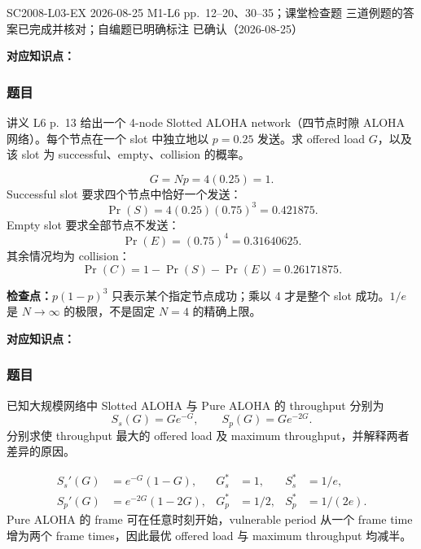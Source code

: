 

\examplemeta
  {SC2008-L03-EX}
  {2026-08-25}
  {M1-L6 pp.~12--20、30--35；课堂检查题}
  {三道例题的答案已完成并核对；自编题已明确标注}
  {已确认（2026-08-25）}


\textbf{对应知识点：}

\subsubsection*{题目}

讲义 L6 p.~13 给出一个 4-node Slotted ALOHA network（四节点时隙 ALOHA 网络）。每个节点在一个 slot 中独立地以 $p=0.25$ 发送。求 offered load $G$，以及该 slot 为 successful、empty、collision 的概率。

\begin{checkedsolution}
\[
  G=Np=4(0.25)=1.
\]
Successful slot 要求四个节点中恰好一个发送：
\[
  \Pr(S)=4(0.25)(0.75)^3=0.421875.
\]
Empty slot 要求全部节点不发送：
\[
  \Pr(E)=(0.75)^4=0.31640625.
\]
其余情况均为 collision：
\[
  \Pr(C)=1-\Pr(S)-\Pr(E)=0.26171875.
\]
\end{checkedsolution}

\textbf{检查点：}$p(1-p)^3$ 只表示某个指定节点成功；乘以 4 才是整个 slot 成功。$1/e$ 是 $N\to\infty$ 的极限，不是固定 $N=4$ 的精确上限。


\textbf{对应知识点：}

\subsubsection*{题目}

已知大规模网络中 Slotted ALOHA 与 Pure ALOHA 的 throughput 分别为
\[
  S_s(G)=Ge^{-G},\qquad S_p(G)=Ge^{-2G}.
\]
分别求使 throughput 最大的 offered load 及 maximum throughput，并解释两者差异的原因。

\begin{checkedsolution}
\begin{align*}
  S_s'(G)&=e^{-G}(1-G),
  &G_s^*&=1,
  &S_s^*&=1/e,\\
  S_p'(G)&=e^{-2G}(1-2G),
  &G_p^*&=1/2,
  &S_p^*&=1/(2e).
\end{align*}
Pure ALOHA 的 frame 可在任意时刻开始，vulnerable period 从一个 frame time 增为两个 frame times，因此最优 offered load 与 maximum throughput 均减半。
\end{checkedsolution}

